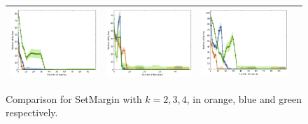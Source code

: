 \documentclass{article}
\renewcommand\[{\begin{equation}}
\renewcommand\]{\end{equation}}
\begin{document}
\begin{figure}[b]
{\begin{tabular}{cccc}
        \includegraphics[width=10em]{figures/synthetic_vs_self_4_normal_sparse_per_query_loss} &
        \includegraphics[width=10em]{figures/synthetic_vs_self_5_normal_sparse_per_iter_loss} &
        \includegraphics[width=10em]{figures/synthetic_vs_self_5_normal_sparse_per_query_loss}
        \\
        \hline
     \end{tabular}
    }
    \caption{\label{fig:selfcomparison} Comparison for {\sc SetMargin} with
    $k=2,3,4$, in orange, blue and green respectively.}
\end{figure}

\end{document}
